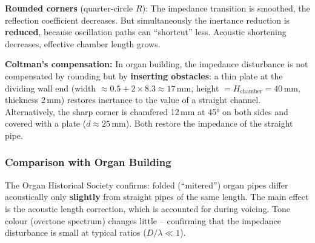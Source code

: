 \documentclass[11pt,a4paper]{article}
\begin{document}
\textbf{Rounded corners} (quarter-circle $R$): The impedance transition is smoothed, the reflection coefficient decreases. But simultaneously the inertance reduction is \textbf{reduced}, because oscillation paths can ``shortcut'' less. Acoustic shortening decreases, effective chamber length grows.

\textbf{Coltman's compensation:} In organ building, the impedance disturbance is not compensated by rounding but by \textbf{inserting obstacles}: a thin plate at the dividing wall end (width $\approx 0.5 + 2 \times 8.3 \approx 17$\,mm, height $= H_\text{chamber} = 40$\,mm, thickness 2\,mm) restores inertance to the value of a straight channel. Alternatively, the sharp corner is chamfered 12\,mm at 45° on both sides and covered with a plate ($d \approx 25$\,mm). Both restore the impedance of the straight pipe.

\begin{table}[H]
\centering\small
{}
\caption{Corner geometry comparison -- acoustic effect}
\end{table}

\subsubsection{Comparison with Organ Building}

The Organ Historical Society confirms: folded (``mitered'') organ pipes differ acoustically only \textbf{slightly} from straight pipes of the same length. The main effect is the acoustic length correction, which is accounted for during voicing. Tone colour (overtone spectrum) changes little -- confirming that the impedance disturbance is small at typical ratios ($D/\lambda \ll 1$).
\end{document}
